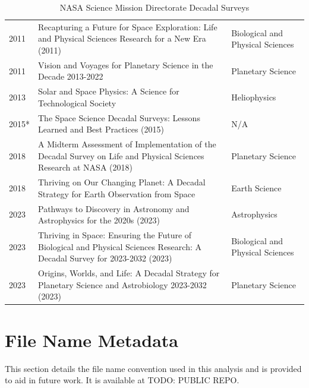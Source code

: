 \documentclass[preprint,12pt,doubleblind]{elsarticle}
\begin{document}
\begin{table}[H]
\begin{tabular}{p{1.2cm} p{8.5cm} p{2.9cm}}
 2011 & Recapturing a Future for Space Exploration: Life and Physical Sciences Research for a New Era (2011) & Biological and Physical Sciences \\

 2011 & Vision and Voyages for Planetary Science in the Decade 2013-2022 & Planetary Science \\

 2013 & Solar and Space Physics: A Science for Technological Society & Heliophysics \\

 2015* & The Space Science Decadal Surveys: Lessons Learned and Best Practices (2015) & N/A \\

 2018 & A Midterm Assessment of Implementation of the Decadal Survey on Life and Physical Sciences Research at NASA (2018) & Planetary Science \\

 2018 & Thriving on Our Changing Planet: A Decadal Strategy for Earth Observation from Space & Earth Science \\

 2023 & Pathways to Discovery in Astronomy and Astrophysics for the 2020s (2023) & Astrophysics \\

 2023 & Thriving in Space: Ensuring the Future of Biological and Physical Sciences Research: A Decadal Survey for 2023-2032 (2023) & Biological and Physical Sciences \\

 2023 & Origins, Worlds, and Life: A Decadal Strategy for Planetary Science and Astrobiology 2023-2032 (2023) & Planetary Science \\

\end{tabular}
\caption{NASA Science Mission Directorate Decadal Surveys}\label{tab:Decadals_all}
\end{table}

\section{File Name Metadata}
\label{app_file_names}
This section details the file name convention used in this analysis and is provided to aid in future work. It is available at TODO: PUBLIC REPO. 
\end{document}
